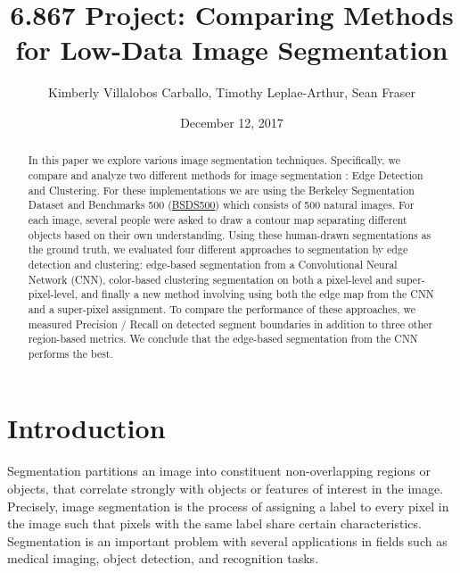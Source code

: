 \documentclass[10pt, twocolumn, twoside]{article}
\title{6.867 Project: Comparing Methods for Low-Data Image Segmentation}
\date{December 12, 2017}
\author {Kimberly Villalobos Carballo, Timothy Leplae-Arthur, Sean Fraser}
\newcommand{\squeezeup}{\vspace{-2.5mm}}
\begin{document}
\maketitle

\begin{abstract}
\squeezeup
In this paper we explore various image segmentation techniques. Specifically, we compare and analyze two different methods for image segmentation \cite{Kaur}: Edge Detection and Clustering. For these implementations we are using the Berkeley Segmentation Dataset and Benchmarks 500 (\href{https://www2.eecs.berkeley.edu/Research/Projects/CS/vision/grouping/resources.html}{BSDS500}) which consists of 500 natural images. For each image, several people were asked to draw a contour map separating different objects based on their own understanding. Using these human-drawn segmentations as the ground truth, we evaluated four different approaches to segmentation by edge detection and clustering: edge-based segmentation from a Convolutional Neural Network (CNN), color-based clustering segmentation on both a pixel-level and super-pixel-level, and finally a new method involving using both the edge map from the CNN and a super-pixel assignment. To compare the performance of these approaches, we measured Precision / Recall on detected segment boundaries in addition to three other region-based metrics.  We conclude that the edge-based segmentation from the CNN performs the best.

\end{abstract}

\section{Introduction}
\squeezeup
\squeezeup
Segmentation partitions an image into constituent non-overlapping regions or objects, that correlate strongly with objects or features of interest in the image. Precisely, image segmentation is the process of assigning a label to every pixel in the image such that pixels with the same label share certain characteristics. Segmentation is an important problem with several applications in fields such as medical imaging, object detection, and recognition tasks.
\end{document}
